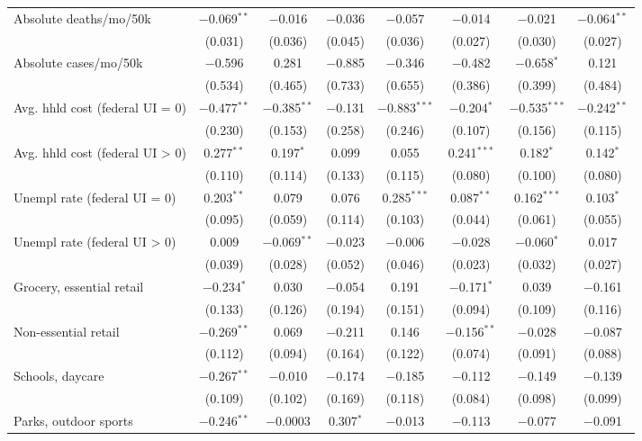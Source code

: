 \begin{table}[!htbp]
\begin{tabular}{@{\extracolsep{5pt}}lccccccc}
 Absolute deaths/mo/50k & $-$0.069$^{**}$ & $-$0.016 & $-$0.036 & $-$0.057 & $-$0.014 & $-$0.021 & $-$0.064$^{**}$ \\ 
  & (0.031) & (0.036) & (0.045) & (0.036) & (0.027) & (0.030) & (0.027) \\ 
  Absolute cases/mo/50k & $-$0.596 & 0.281 & $-$0.885 & $-$0.346 & $-$0.482 & $-$0.658$^{*}$ & 0.121 \\ 
  & (0.534) & (0.465) & (0.733) & (0.655) & (0.386) & (0.399) & (0.484) \\ 
  Avg. hhld cost (federal UI = 0) & $-$0.477$^{**}$ & $-$0.385$^{**}$ & $-$0.131 & $-$0.883$^{***}$ & $-$0.204$^{*}$ & $-$0.535$^{***}$ & $-$0.242$^{**}$ \\ 
  & (0.230) & (0.153) & (0.258) & (0.246) & (0.107) & (0.156) & (0.115) \\ 
  Avg. hhld cost (federal UI > 0) & 0.277$^{**}$ & 0.197$^{*}$ & 0.099 & 0.055 & 0.241$^{***}$ & 0.182$^{*}$ & 0.142$^{*}$ \\ 
  & (0.110) & (0.114) & (0.133) & (0.115) & (0.080) & (0.100) & (0.080) \\ 
  Unempl rate (federal UI = 0) & 0.203$^{**}$ & 0.079 & 0.076 & 0.285$^{***}$ & 0.087$^{**}$ & 0.162$^{***}$ & 0.103$^{*}$ \\ 
  & (0.095) & (0.059) & (0.114) & (0.103) & (0.044) & (0.061) & (0.055) \\ 
  Unempl rate (federal UI > 0) & 0.009 & $-$0.069$^{**}$ & $-$0.023 & $-$0.006 & $-$0.028 & $-$0.060$^{*}$ & 0.017 \\ 
  & (0.039) & (0.028) & (0.052) & (0.046) & (0.023) & (0.032) & (0.027) \\ 
  Grocery, essential retail & $-$0.234$^{*}$ & 0.030 & $-$0.054 & 0.191 & $-$0.171$^{*}$ & 0.039 & $-$0.161 \\ 
  & (0.133) & (0.126) & (0.194) & (0.151) & (0.094) & (0.109) & (0.116) \\ 
  Non-essential retail & $-$0.269$^{**}$ & 0.069 & $-$0.211 & 0.146 & $-$0.156$^{**}$ & $-$0.028 & $-$0.087 \\ 
  & (0.112) & (0.094) & (0.164) & (0.122) & (0.074) & (0.091) & (0.088) \\ 
  Schools, daycare & $-$0.267$^{**}$ & $-$0.010 & $-$0.174 & $-$0.185 & $-$0.112 & $-$0.149 & $-$0.139 \\ 
  & (0.109) & (0.102) & (0.169) & (0.118) & (0.084) & (0.098) & (0.099) \\ 
  Parks, outdoor sports & $-$0.246$^{**}$ & $-$0.0003 & 0.307$^{*}$ & $-$0.013 & $-$0.113 & $-$0.077 & $-$0.091 \\ 

\end{tabular}
\end{table}
